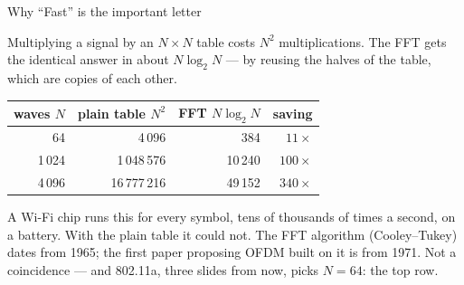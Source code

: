 \begin{frame}{Why ``Fast'' is the important letter}
  \vspace{0.3em}
  {\small Multiplying a signal by an $N\times N$ table costs $N^2$ multiplications.
   The FFT gets the identical answer in about $N\log_2 N$ --- by reusing the halves of
   the table, which are copies of each other.\par}

  \vspace{0.6em}
  \centering
  {\small
  \renewcommand{\arraystretch}{1.3}
  \begin{tabular}{r r r r}
    \toprule
    waves $N$ & plain table $N^2$ & FFT $N\log_2 N$ & saving \\
    \midrule
    64    & 4\,096       & 384    & $11\times$ \\
    1\,024 & 1\,048\,576 & 10\,240 & $100\times$ \\
    4\,096 & 16\,777\,216 & 49\,152 & $340\times$ \\
    \bottomrule
  \end{tabular}}

  \vspace{0.7em}
  {\small A Wi-Fi chip runs this for every symbol, tens of thousands of times a
   second, on a battery. With the plain table it could not. The FFT algorithm
   (Cooley--Tukey) dates from 1965; the first paper proposing OFDM built on it is
   from 1971. Not a coincidence --- and 802.11a, three slides from now, picks
   $N = 64$: the top row.\par}

  \vspace{0.3em}
\end{frame}

